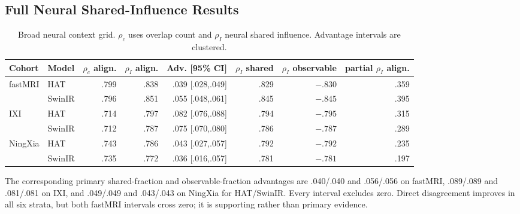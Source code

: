 \subsection{Full Neural Shared-Influence Results}
\begin{table}[t]
\centering
\caption{Broad neural context grid. $\rho_c$ uses overlap count and $\rho_I$ neural shared influence. Advantage intervals are clustered.}
\label{tab:neural-full}
\scriptsize
\setlength{\tabcolsep}{3pt}
\begin{tabular}{llrrrrrr}
\toprule
Cohort & Model & $\rho_c$ align. & $\rho_I$ align. & Adv. [95\% CI] & $\rho_I$ shared & $\rho_I$ observable & partial $\rho_I$ align. \\
\midrule
fastMRI & HAT & .799 & .838 & .039 [.028,.049] & .829 & $-.830$ & .359 \\
 & SwinIR & .796 & .851 & .055 [.048,.061] & .845 & $-.845$ & .395 \\
IXI & HAT & .714 & .797 & .082 [.076,.088] & .794 & $-.795$ & .315 \\
 & SwinIR & .712 & .787 & .075 [.070,.080] & .786 & $-.787$ & .289 \\
NingXia & HAT & .743 & .786 & .043 [.027,.057] & .792 & $-.792$ & .235 \\
 & SwinIR & .735 & .772 & .036 [.016,.057] & .781 & $-.781$ & .197 \\
\bottomrule
\end{tabular}
\end{table}

The corresponding primary shared-fraction and observable-fraction advantages are .040/.040 and .056/.056 on fastMRI, .089/.089 and .081/.081 on IXI, and .049/.049 and .043/.043 on NingXia for HAT/SwinIR. Every interval excludes zero. Direct disagreement improves in all six strata, but both fastMRI intervals cross zero; it is supporting rather than primary evidence.

